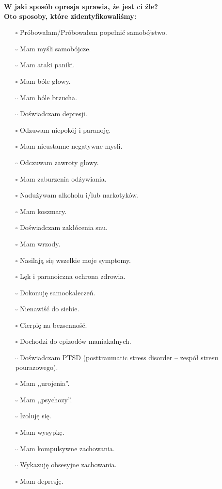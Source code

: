 \noindent\textcolor{ProcessBlue}{\textbf{\Large{W jaki sposób opresja sprawia, że jest ci źle?}}}\\
\textbf{\large{Oto sposoby, które zidentyfikowaliśmy:}}
\begin{multicols}{2}
\begin{itemize}
\item[$\square$]{Próbowałam/Próbowałem popełnić samobójstwo.}
\item[$\square$]{Mam myśli samobójcze.}
\item[$\square$]{Mam ataki paniki.}
\item[$\square$]{Mam bóle głowy.}
\item[$\square$]{Mam bóle brzucha.}
\item[$\square$]{Doświadczam depresji.}
\item[$\square$]{Odzuwam niepokój i paranoję.}
\item[$\square$]{Mam nieustanne negatywne mysli.}
\item[$\square$]{Odczuwam zawroty głowy.}
\item[$\square$]{Mam zaburzenia odżywiania.}
\item[$\square$]{Nadużywam alkoholu i/lub narkotyków.}
\item[$\square$]{Mam koszmary.}
\item[$\square$]{Doświadczam zakłócenia snu.}
\item[$\square$]{Mam wrzody.}
\item[$\square$]{Nasilają się wszelkie moje symptomy.}
\item[$\square$]{Lęk i paranoiczna ochrona zdrowia.}
\item[$\square$]{Dokonuję samookaleczeń.}
\item[$\square$]{Nienawiść do siebie.}
\item[$\square$]{Cierpię na bezsenność.}
\item[$\square$]{Dochodzi do epizodów maniakalnych.}
\item[$\square$]{Doświadczam PTSD (posttraumatic stress disorder -- zespół stresu pourazowego).}
\item[$\square$]{Mam ,,urojenia''.}
\item[$\square$]{Mam ,,psychozy''.}
\item[$\square$]{Izoluję się.}
\item[$\square$]{Mam wysypkę.}
\item[$\square$]{Mam kompulsywne zachowania.}
\item[$\square$]{Wykazuję obsesyjne zachowania.}
\item[$\square$]{Mam depresję.}
\end{itemize}
\end{multicols}



